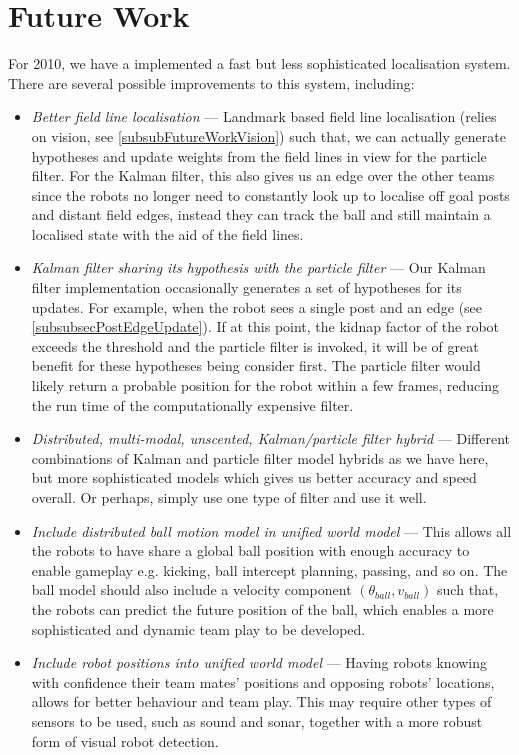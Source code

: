 \documentclass[pdftex,11pt,a4paper]{report}
\begin{document}
\section{Future Work}
For 2010, we have a implemented a fast but less sophisticated localisation system. There are several possible improvements to this system, including:
\begin{itemize}
  \item \emph{Better field line localisation} --- Landmark based field line localisation (relies on vision, see \autoref{subsubFutureWorkVision}) such that, we can actually generate hypotheses and update weights from the field lines in view for the particle filter. For the Kalman filter, this also gives us an edge over the other teams since the robots no longer need to constantly look up to localise off goal posts and distant field edges, instead they can track the ball and still maintain a localised state with the aid of the field lines. 
  \item \emph{Kalman filter sharing its hypothesis with the particle filter} --- Our Kalman filter implementation occasionally generates a set of hypotheses for its updates. For example, when the robot sees a single post and an edge (see \autoref{subsubsecPostEdgeUpdate}). If at this point, the kidnap factor of the robot exceeds the threshold and the particle filter is invoked, it will be of great benefit for these hypotheses being consider first. The particle filter would likely return a probable position for the robot within a few frames, reducing the run time of the computationally expensive filter.  
  \item \emph{Distributed, multi-modal, unscented, Kalman/particle filter hybrid} --- Different combinations of Kalman and particle filter model hybrids as we have here, but more sophisticated models which gives us better accuracy and speed overall. Or perhaps, simply use one type of filter and use it well. 
  \item \emph{Include distributed ball motion model in unified world model} --- This allows all the robots to have share a global ball position with enough accuracy to enable gameplay e.g. kicking, ball intercept planning, passing, and so on. The ball model should also include a velocity component $(\theta_{ball}, v_{ball})$ such that, the robots can predict the future position of the ball, which enables a more sophisticated and dynamic team play to be developed. 
  \item \emph{Include robot positions into unified world model} --- Having robots knowing with confidence their team mates' positions and opposing robots' locations, allows for better behaviour and team play. This may require other types of sensors to be used, such as sound and sonar, together with a more robust form of visual robot detection.
\end{itemize}
\end{document}
